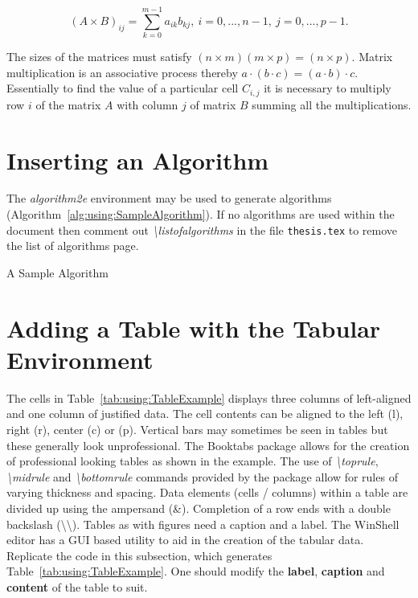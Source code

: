 \begin{equation}
(A \times B)_{ij} = \sum_{k=0} ^{m-1} a_{ik}b_{kj},~
i=0,...,n-1,~j=0,...,p-1.
\end{equation}

The sizes of the matrices must satisfy $(n \times m)(m \times p) =
(n \times p)$. Matrix multiplication is an associative process
thereby $a\cdot(b \cdot c) = (a \cdot b) \cdot c$. Essentially to
find the value of a particular cell $C_{i,j}$ it is necessary to
multiply row $i$ of the matrix $A$ with column $j$ of matrix $B$
summing all the multiplications.

\clearpage
\section{Inserting an Algorithm}

The \emph{algorithm2e} environment \cite{online:Fiorio2016algorithm2e} may be used to generate algorithms (Algorithm~\ref{alg:using:SampleAlgorithm}). If no algorithms are used within the document then comment out \emph{\textbackslash listofalgorithms } in the file {\tt thesis.tex} to remove the list of algorithms page.

\begin{algorithm}
{}
\caption{A Sample Algorithm} \label{alg:using:SampleAlgorithm}
\end{algorithm}


\section{Adding a Table with the Tabular Environment}

The cells in Table~\ref{tab:using:TableExample} displays three columns of left-aligned and one column of justified data. The cell contents can be aligned to the left (l), right (r), center (c) or (p). Vertical bars may sometimes be seen in tables but these generally look unprofessional. The Booktabs package \cite{online:Fear2016BookTabs} allows for the creation of professional looking tables as shown in the example.  The use of \emph{\textbackslash toprule}, \emph{\textbackslash midrule} and \emph{\textbackslash bottomrule} commands provided by the package allow for rules of varying thickness and spacing. Data elements (cells / columns) within a table are divided up using the ampersand (\&). Completion of a row ends with a double backslash (\textbackslash\textbackslash). Tables as with figures need a caption and a label. The WinShell editor has a GUI based utility to aid in the creation of the tabular data. Replicate the code in this subsection, which generates Table~\ref{tab:using:TableExample}. One should modify the \textbf{label}, \textbf{caption} and \textbf{content} of the table to suit.

